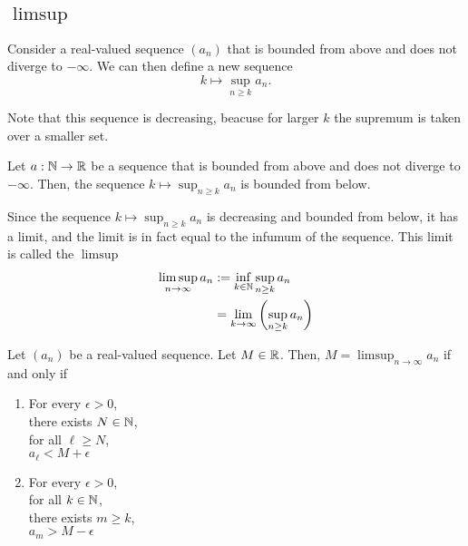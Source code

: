 \subsection{$\limsup$}
Consider a real-valued sequence $(a_n)$ that is bounded from above and does not diverge to $-\infty$. We can then define a new sequence
$$k \mapsto \sup_{n \ge k} a_n.$$

Note that this sequence is decreasing, beacuse for larger $k$ the supremum is taken over a smaller set. 
\begin{lemma}
    Let $a: \mathbb{N} \to \mathbb{R}$ be a sequence that is bounded from above and does not diverge to $-\infty$. Then, the sequence $k \mapsto \sup_{n \ge k}a_n$ is bounded
    from below.
\end{lemma}

Since the sequence $k \mapsto \sup_{n \ge k}a_n$ is decreasing and bounded from below, it has a limit, and the limit is in fact equal to the infumum of the sequence. This limit is called the $\limsup$
\begin{align*}
    \limsup_{n\to\infty}a_n &:= \inf_{k\in\mathbb{N}}\sup_{n \ge k}a_n \\
                            &=\lim_{k\to\infty}\left(\sup_{n\ge k}a_n\right)
\end{align*}

\begin{proposition}
    Let $(a_n)$ be a real-valued sequence. Let $M \in \mathbb{R}$. Then, $M = \limsup_{n\to\infty}a_n$ if and only if
    \begin{enumerate}[label=\roman*.]
        \item 
            \begin{center}
                \parbox{\linewidth}{%
                    \linewidth
                    For every $\epsilon > 0$, \\
                    \hspace*{1em} there exists $N \in \mathbb{N}$, \\
                    \hspace*{2em} for all $\ell \ge N$, \\
                    \hspace*{3em} $a_\ell < M + \epsilon$
                }
            \end{center}
        \item 
            \begin{center}
                \parbox{\linewidth}{
                    \linewidth
                    For every $\epsilon > 0$, \\
                    \hspace*{1em} for all $k \in \mathbb{N}$, \\
                    \hspace*{2em} there exists $m \ge k$, \\
                    \hspace*{3em} $a_m > M - \epsilon$ \\
                }
            \end{center}
    \end{enumerate}
\end{proposition}

